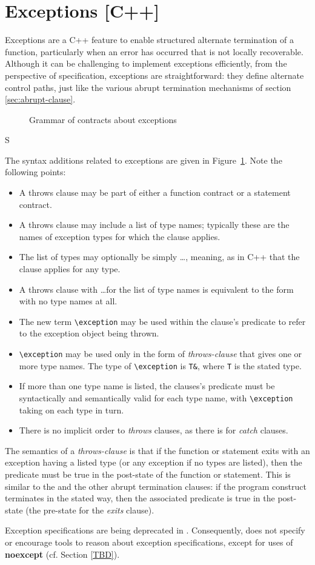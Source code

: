\section{Exceptions [C++]}
\label{sec:exceptions}

Exceptions are a C++ feature to enable structured alternate termination of a function, particularly when an error has occurred that is not locally recoverable. Although it can be challenging to implement exceptions efficiently, from the perspective of specification, exceptions are straightforward: they define alternate control paths, just like the various abrupt termination mechanisms of section \ref{sec:abrupt-clause}.

\begin{figure}[t]
	\begin{cadre}
		
	\end{cadre}
	\caption{Grammar of contracts about exceptions}
	\label{fig:gram:throws-clause}
\end{figure}S


The syntax additions related to exceptions are given in 
Figure~\ref{fig:gram:throws-clause}. Note the following points:
\begin{itemize}
\item A throws clause may be part of either a function contract or a statement contract.
\item A throws clause may include a list of type names; typically these are the names of exception types for which the
clause applies.
\item The list of types may optionally be simply \ldots, meaning, as in C++ that the clause applies for any type.
\item A throws clause with \ldots for the list of type names is equivalent to the form with no type names at all.
\item The new term \lstinline|\exception| may be used within the clause's predicate to refer to the exception object being thrown. 
\item \lstinline|\exception| may be used only in the form of \textsl{throws-clause} that gives one or more type names. The type of \lstinline|\exception| is \lstinline|T&|, where \lstinline|T| is the stated type.
\item If more than one type name is listed, the clauses's predicate must be syntactically and semantically valid for each type name, with \lstinline|\exception| taking on each type in turn.
\item There is no implicit order to \textsl{throws} clauses, as there is for \textsl{catch} clauses.
\end{itemize}
The semantics of a \textsl{throws-clause} is that if the function or statement exits with an exception having a listed type (or any exception if no types are listed), then the predicate must be true in the post-state of the function or statement. This is similar to the \ensures and the other abrupt termination clauses: if the program construct terminates in the stated way, then the associated predicate is true in the post-state (the pre-state for the \textsl{exits} clause).

Exception specifications are being deprecated in \lang. Consequently, \NAME{} does not specify or encourage tools to reason about \lang{} exception specifications, except for  uses of \textbf{noexcept} (cf. Section \ref{TBD}).


